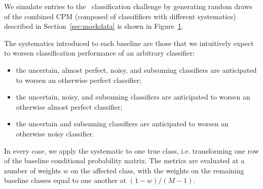 \begin{figure}
\begin{center}
{%
		}
	\end{center}
	\label{fig:all_combined}
\end{figure}
We simulate entries to the \plasticc\ classification challenge by generating random draws of the combined CPM (composed of classififiers with different systematics) described in Section~\ref{sec:mockdata} is shown in Figure~\ref{fig:all_combined}.

The systematics introduced to each baseline are those that we intuitively expect to worsen classification performance of an arbitrary classifier:
\begin{itemize}
\item the uncertain, almost perfect, noisy, and subsuming classifiers are anticipated to worsen an otherwise perfect classifier;
\item the uncertain, noisy, and subsuming classifiers are anticipated to worsen an otherwise almost perfect classifier;
\item the uncertain and subsuming classifiers are anticipated to worsen an otherwise noisy classifier.
\end{itemize}

In every case, we apply the systematic to one true class, i.e. transforming one row of the baseline conditional probability matrix.
The metrics are evaluated at a number of weights $w$ on the affected class, with the weights on the remaining baseline classes equal to one another at $(1 - w) / (M - 1)$.


